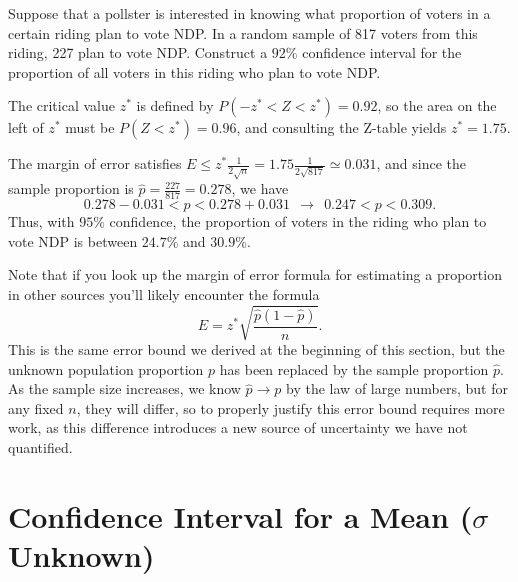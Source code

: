 \begin{examp}Suppose that a pollster is interested in knowing what proportion of voters in a certain riding plan to vote NDP. In a random sample of 817 voters from this riding, 227 plan to vote NDP. Construct a $92\%$ confidence interval for the proportion of all voters in this riding who plan to vote NDP.
\par
\noindent The critical value $z^*$ is defined by $P(-z^* < Z < z^*) = 0.92$, so the area on the left of $z^*$ must be $P(Z < z^*) = 0.96$, and consulting the Z-table yields $z^* = 1.75$.
\begin{center}
\end{center}
\noindent The margin of error satisfies $E \leq z^*  \frac{1}{2\sqrt{n}} = 1.75 \frac{1}{2\sqrt{817}} \simeq 0.031$, and since the sample proportion is $\widehat{p} = \frac{227}{817} = 0.278$, we have
$$0.278-0.031 < p < 0.278+0.031 \ \ \rightarrow \ \ 0.247 < p < 0.309.$$
\noindent Thus, with $95\%$ confidence, the proportion of voters in the riding who plan to vote NDP is between $24.7\%$ and $30.9\%$.
\end{examp}
\par
Note that if you look up the margin of error formula for estimating a proportion in other sources you'll likely encounter the formula $$E = z^*\sqrt{\frac{\widehat{p}(1-\widehat{p})}{n}}.$$
This is the same error bound we derived at the beginning of this section, but the unknown population proportion $p$ has been replaced by the sample proportion $\widehat{p}$. As the sample size increases, we know $\widehat{p} \rightarrow p$ by the law of large numbers, but for any fixed $n$, they will differ, so to properly justify this error bound requires more work, as this difference introduces a new source of uncertainty we have not quantified.

\section{Confidence Interval for a Mean ($\sigma$ Unknown)}

